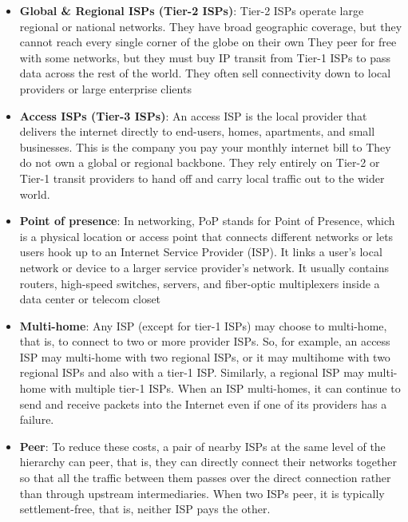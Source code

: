 \documentclass{report}
\begin{document}
\begin{itemize}
            \bigbreak \noindent 
            They reach the entire global internet without ever paying anyone for data traffic (IP transit). Instead, they use settlement-free peering, trading data traffic freely with other Tier-1 networks on equal terms.
            \bigbreak \noindent 
            Examples are AT\&T, Verizon, Tata Communications, and Lumen Technologies
        \item \textbf{Global \& Regional ISPs (Tier-2 ISPs)}:   Tier-2 ISPs operate large regional or national networks. They have broad geographic coverage, but they cannot reach every single corner of the globe on their own
            \bigbreak \noindent 
            They peer for free with some networks, but they must buy IP transit from Tier-1 ISPs to pass data across the rest of the world. They often sell connectivity down to local providers or large enterprise clients
        \item \textbf{Access ISPs (Tier-3 ISPs)}: An access ISP is the local provider that delivers the internet directly to end-users, homes, apartments, and small businesses. This is the company you pay your monthly internet bill to
            \bigbreak \noindent 
            They do not own a global or regional backbone. They rely entirely on Tier-2 or Tier-1 transit providers to hand off and carry local traffic out to the wider world.
        \item \textbf{Point of presence}: In networking, PoP stands for Point of Presence, which is a physical location or access point that connects different networks or lets users hook up to an Internet Service Provider (ISP).
            \bigbreak \noindent 
            It links a user's local network or device to a larger service provider's network.  It usually contains routers, high-speed switches, servers, and fiber-optic multiplexers inside a data center or telecom closet
        \item \textbf{Multi-home}: Any ISP (except for tier-1 ISPs) may choose to multi-home, that is, to connect to two or more provider ISPs. So, for example, an access ISP may multi-home with two regional ISPs, or it may multihome with two regional ISPs and also with a tier-1 ISP. Similarly, a regional ISP may multi-home with multiple tier-1 ISPs. When an ISP multi-homes, it can continue to send and receive packets into the Internet even if one of its providers has a failure.
        \item \textbf{Peer}: To reduce these costs, a pair of nearby ISPs at the same level of the hierarchy can peer, that is, they can directly connect their networks together so that all the traffic between them passes over the direct connection rather than through upstream intermediaries. When two ISPs peer, it is typically settlement-free, that is, neither ISP pays the other.

\end{itemize}
\end{document}
